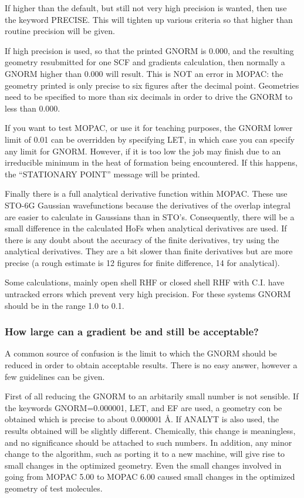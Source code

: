 \documentclass[a4paper]{book}
\newcommand{\mi}[1]{#1\index{#1}}
\begin{document}
        If higher than the default, but still not very  high  precision  is
   wanted,  then  use  the  keyword  PRECISE.  This will tighten up various
   criteria so that higher than routine precision will be given.

        If high precision is used, so that the printed GNORM is 0.000,  and
   the   resulting   geometry   resubmitted   for  one  SCF  and  gradients
   calculation, then normally a GNORM higher than 0.000 will result.   This
   is  NOT  an error in MOPAC:  the geometry printed is only precise to six
   figures after the decimal point.  Geometries need  to  be  specified  to
   more than six decimals in order to drive the GNORM to less than 0.000.

        If you want to test MOPAC, or use it  for  teaching  purposes,  the
   GNORM  lower limit of 0.01 can be overridden by specifying LET, in which
   case you can specify any limit for GNORM.  However, if it is too low the
   job  may  finish  due to an irreducible minimum in the heat of formation
   being encountered.  If this happens, the ``STATIONARY POINT'' message will
   be printed.

        Finally there is  a  full  analytical  derivative  function  within
   MOPAC.   These use STO-6G Gaussian wavefunctions because the derivatives
   of the overlap integral are easier to calculate  in  Gaussians  than  in
   STO's.  Consequently, there will be a small difference in the calculated
   HoFs when \mi{analytical derivatives} are used.  If  there  is  any  doubt
   about  the  accuracy of the finite derivatives, try using the analytical
   derivatives.  They are a bit slower than finite derivatives but are more
   precise  (a  rough  estimate is 12 figures for finite difference, 14 for
   analytical).

        Some calculations, mainly open shell RHF or closed shell  RHF  with
   C.I. have untracked errors which prevent very high precision.  For these
   systems GNORM should be in the range 1.0 to 0.1.

\subsubsection{How large can a gradient be and still be acceptable?}
        A common source of confusion is the limit to which the GNORM should
   be  reduced  in  order  to  obtain acceptable results.  There is no easy
   answer, however a few guidelines can be given.
 
      First of all reducing the GNORM to an arbitarily  small  number  is
 not  sensible.   If the keywords GNORM=0.000001, LET, and EF are used, a
 geometry con be obtained which is precise to about  0.000001 \AA.
 If ANALYT is also used, the results obtained will be slightly different.
 Chemically, this change is meaningless, and no  significance  should  be
 attached  to  such  numbers.   In  addition,  any  minor  change  to the
 algorithm, such as porting it to a new machine, will give rise to  small
 changes  in  the optimized geometry.  Even the small changes involved in
 going from MOPAC  5.00  to  MOPAC  6.00  caused  small  changes  in  the
 optimized geometry of test molecules.
\end{document}
